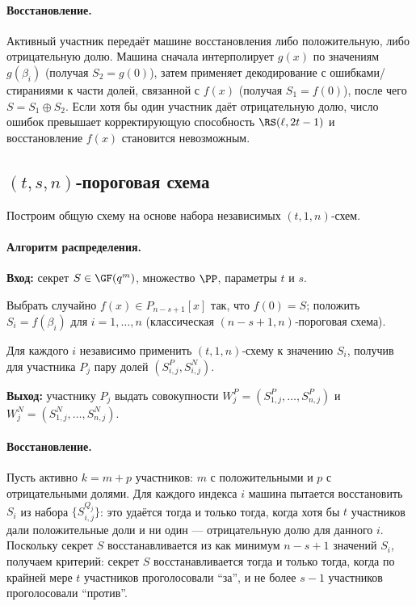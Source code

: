 \documentclass[a4paper,12pt]{article}
\begin{document}
\paragraph{Восстановление.}
Активный участник передаёт машине восстановления либо положительную, либо отрицательную долю. Машина сначала интерполирует $g(x)$ по значениям $g(\beta_i)$ (получая $S_2=g(0)$), затем применяет декодирование с ошибками/стираниями к части долей, связанной с $f(x)$ (получая $S_1=f(0)$), после чего $S=S_1\oplus S_2$. Если хотя бы один участник даёт отрицательную долю, число ошибок превышает корректирующую способность $\RS(\ell,2t-1)$ и восстановление $f(x)$ становится невозможным.

\subsection{$(t,s,n)$‑пороговая схема}

Построим общую схему на основе набора независимых $(t,1,n)$‑схем.

\paragraph{Алгоритм распределения.}
\begin{framed}
\textbf{Вход:} секрет $S\in\GF(q^m)$, множество $\PP$, параметры $t$ и $s$.

Выбрать случайно $f(x)\in P_{n-s+1}[x]$ так, что $f(0)=S$; положить $S_i=f(\beta_i)$ для $i=1,\ldots,n$ (классическая $(n-s+1,n)$‑пороговая схема).

Для каждого $i$ независимо применить $(t,1,n)$‑схему к значению $S_i$, получив для участника $P_j$ пару долей $(S_{i,j}^P,S_{i,j}^N)$.

\textbf{Выход:} участнику $P_j$ выдать совокупности $W_j^P=(S_{1,j}^P,\ldots,S_{n,j}^P)$ и $W_j^N=(S_{1,j}^N,\ldots,S_{n,j}^N)$.
\end{framed}

\paragraph{Восстановление.}
Пусть активно $k=m+p$ участников: $m$ с положительными и $p$ с отрицательными долями. Для каждого индекса $i$ машина пытается восстановить $S_i$ из набора $\{S_{i,j}^{Q_j}\}$: это удаётся тогда и только тогда, когда хотя бы $t$ участников дали положительные доли и ни один --- отрицательную долю для данного $i$. Поскольку секрет $S$ восстанавливается из как минимум $n-s+1$ значений $S_i$, получаем критерий: секрет $S$ восстанавливается тогда и только тогда, когда по крайней мере $t$ участников проголосовали \enquote{за}, и не более $s-1$ участников проголосовали \enquote{против}.
\end{document}
